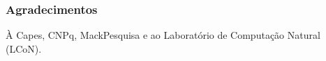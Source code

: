 \documentclass[aspectratio=43,hyperref={pdfpagelabels=false}]{beamer}
\begin{document}
%      

\section*{}
\begin{frame}[t]
     \frametitle{Agradecimentos}
\vspace{1cm}
\center
     À Capes, CNPq, MackPesquisa e ao Laboratório de Computação Natural (LCoN).
\end{frame}
\end{document}
